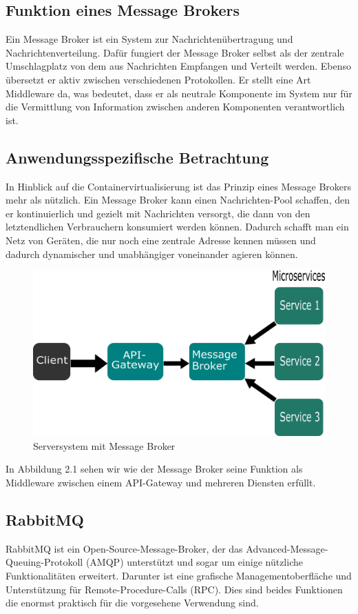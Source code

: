 \documentclass[12pt,a4paper]{scrartcl}
\begin{document}
\subsection{Funktion eines Message Brokers}
Ein Message Broker ist ein System zur Nachrichtenübertragung und Nachrichtenverteilung. Dafür fungiert der Message Broker selbst als der zentrale Umschlagplatz von dem aus Nachrichten Empfangen und Verteilt werden. Ebenso übersetzt er aktiv zwischen verschiedenen Protokollen\cite{mesBro}. Er stellt eine Art Middleware da, was bedeutet, dass er als neutrale Komponente im System nur für die Vermittlung von Information zwischen anderen Komponenten verantwortlich ist.

\subsection{Anwendungsspezifische Betrachtung}
In Hinblick auf die Containervirtualisierung ist das Prinzip eines Message Brokers mehr als nützlich.
Ein Message Broker kann einen Nachrichten-Pool schaffen, den er kontinuierlich und gezielt mit Nachrichten versorgt, die dann von den letztendlichen Verbrauchern konsumiert werden können. Dadurch schafft man ein Netz von Geräten, die nur noch eine zentrale Adresse kennen müssen und dadurch dynamischer und unabhängiger voneinander agieren können. 

\begin{figure}[h!]
	\centering
	\includegraphics[scale=1.8]{MesBroSys.png}
	\caption[Selbst erstellte Grafik]{Serversystem mit Message Broker}
\end{figure}

In Abbildung 2.1 sehen wir wie der Message Broker seine Funktion als Middleware zwischen einem API-Gateway und mehreren Diensten erfüllt.  

\subsection{RabbitMQ}
RabbitMQ ist ein Open-Source-Message-Broker, der das Advanced-Message-Queuing-Protokoll (AMQP) unterstützt und sogar um einige nützliche Funktionalitäten erweitert\cite{rabExt}.
Darunter ist eine grafische Managementoberfläche und Unterstützung für Remote-Procedure-Calls (RPC). Dies sind beides Funktionen die enormst praktisch für die vorgesehene Verwendung sind.
\end{document}
